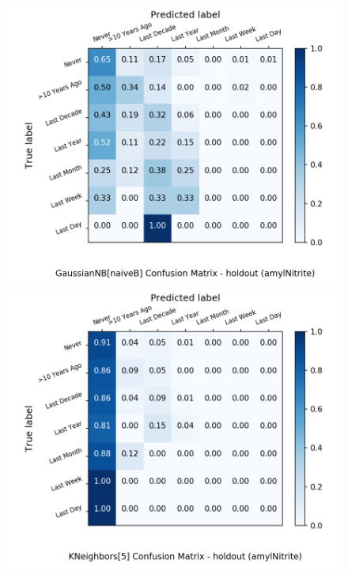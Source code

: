 \begin{figure}[H]
	\begin{minipage}[b]{0.32\textwidth}
		\includegraphics[width=1.1\textwidth]{Plots/drugs/amylNitrite_GaussianNB_naiveB_balance_False_holdout.png}
	\end{minipage}
	\begin{minipage}[b]{0.32\textwidth}
		\includegraphics[width=1.1\textwidth]{Plots/drugs/amylNitrite_KNeighbors_5_balance_False_holdout.png}
  \end{minipage}
	\begin{minipage}[b]{0.32\textwidth}

\end{minipage}
\end{figure}
